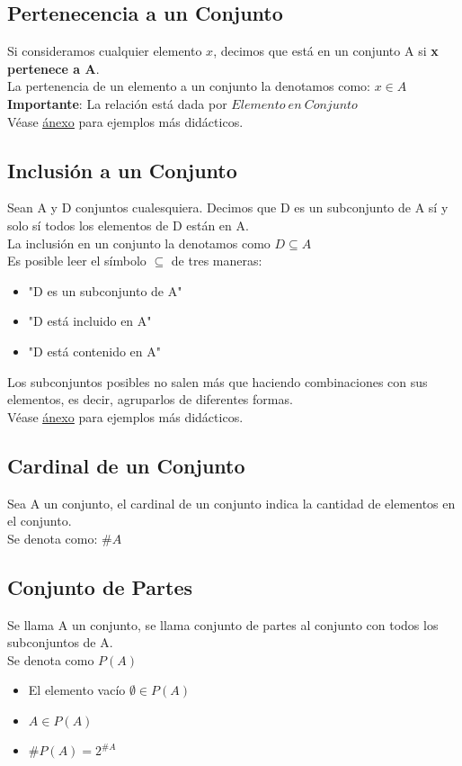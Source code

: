 \documentclass[10pt,a4paper]{article}
\begin{document}
\subsection*{Pertenecencia a un Conjunto}
Si consideramos cualquier elemento $x$, decimos que está en un conjunto A si \textbf{x pertenece a A}. \\
La pertenencia de un elemento a un conjunto la denotamos como: $x \in A$ \\
\textbf{Importante}: La relación está dada por $Elemento \ en \ Conjunto$ \\
Véase \hyperref[subsec:pertenecencia_conjuntos]{\underline{ánexo}} para ejemplos más didácticos.
\subsection*{Inclusión a un Conjunto}
Sean A y D conjuntos cualesquiera.
Decimos que D es un subconjunto de A sí y solo sí todos los elementos de D están en A. \\
La inclusión en un conjunto la denotamos como $D \subseteq A$ \\
Es posible leer el símbolo $ \subseteq $ de tres maneras: 
\begin{itemize}
    \item "D es un subconjunto de A"
    \item "D está incluido en A"
    \item "D está contenido en A"
\end{itemize}
Los subconjuntos posibles no salen más que haciendo combinaciones con sus elementos, es decir, agruparlos de diferentes formas. \\
Véase \hyperref[subsec:inclusion_conjuntos]{\underline{ánexo}} para ejemplos más didácticos.
\subsection*{Cardinal de un Conjunto}
Sea A un conjunto, el cardinal de un conjunto indica la cantidad de elementos en el conjunto. \\
Se denota como: $\#A$
\subsection*{Conjunto de Partes}
Se llama A un conjunto, se llama conjunto de partes al conjunto con todos los subconjuntos de A. \\
Se denota como $P(A)$
\begin{itemize}
    \item El elemento vacío $\emptyset \in P(A)$
    \item $A \in P(A)$
    \item $\#P(A) = 2^{\#A}$
\end{itemize}
\end{document}
